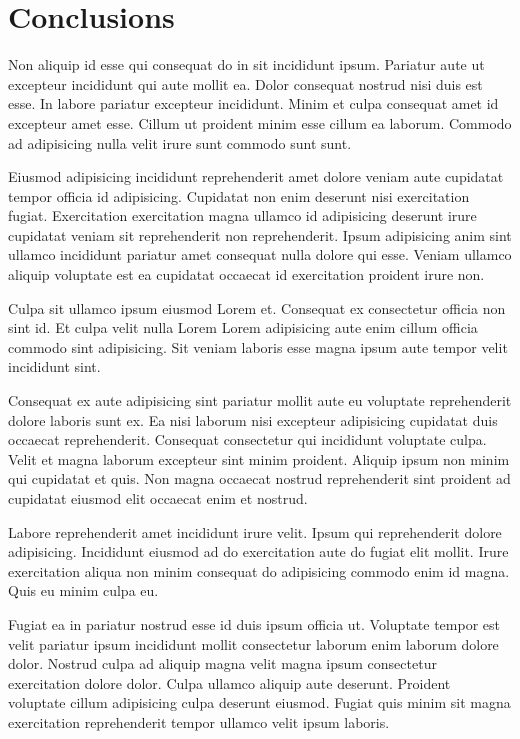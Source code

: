 \section{Conclusions}
Non aliquip id esse qui consequat do in sit incididunt ipsum. Pariatur aute ut excepteur incididunt qui aute mollit ea. Dolor consequat nostrud nisi duis est esse. In labore pariatur excepteur incididunt. Minim et culpa consequat amet id excepteur amet esse. Cillum ut proident minim esse cillum ea laborum. Commodo ad adipisicing nulla velit irure sunt commodo sunt sunt.

Eiusmod adipisicing incididunt reprehenderit amet dolore veniam aute cupidatat tempor officia id adipisicing. Cupidatat non enim deserunt nisi exercitation fugiat. Exercitation exercitation magna ullamco id adipisicing deserunt irure cupidatat veniam sit reprehenderit non reprehenderit. Ipsum adipisicing anim sint ullamco incididunt pariatur amet consequat nulla dolore qui esse. Veniam ullamco aliquip voluptate est ea cupidatat occaecat id exercitation proident irure non.

Culpa sit ullamco ipsum eiusmod Lorem et. Consequat ex consectetur officia non sint id. Et culpa velit nulla Lorem Lorem adipisicing aute enim cillum officia commodo sint adipisicing. Sit veniam laboris esse magna ipsum aute tempor velit incididunt sint.

Consequat ex aute adipisicing sint pariatur mollit aute eu voluptate reprehenderit dolore laboris sunt ex. Ea nisi laborum nisi excepteur adipisicing cupidatat duis occaecat reprehenderit. Consequat consectetur qui incididunt voluptate culpa. Velit et magna laborum excepteur sint minim proident. Aliquip ipsum non minim qui cupidatat et quis. Non magna occaecat nostrud reprehenderit sint proident ad cupidatat eiusmod elit occaecat enim et nostrud.

Labore reprehenderit amet incididunt irure velit. Ipsum qui reprehenderit dolore adipisicing. Incididunt eiusmod ad do exercitation aute do fugiat elit mollit. Irure exercitation aliqua non minim consequat do adipisicing commodo enim id magna. Quis eu minim culpa eu.

Fugiat ea in pariatur nostrud esse id duis ipsum officia ut. Voluptate tempor est velit pariatur ipsum incididunt mollit consectetur laborum enim laborum dolore dolor. Nostrud culpa ad aliquip magna velit magna ipsum consectetur exercitation dolore dolor. Culpa ullamco aliquip aute deserunt. Proident voluptate cillum adipisicing culpa deserunt eiusmod. Fugiat quis minim sit magna exercitation reprehenderit tempor ullamco velit ipsum laboris.

